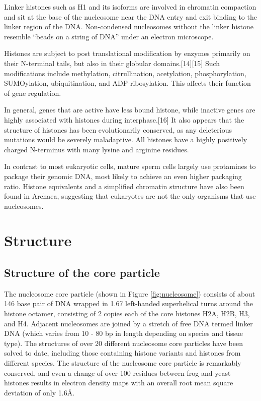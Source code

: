 Linker histones such as H1 and its isoforms are involved in chromatin compaction and sit at the base of the nucleosome near the DNA entry and exit binding to the linker region of the DNA. Non-condensed nucleosomes without the linker histone resemble ``beads on a string of DNA'' under an electron microscope.

Histones are subject to post translational modification by enzymes primarily on their N-terminal tails, but also in their globular domains.{[}14{]}{[}15{]} Such modifications include methylation, citrullination, acetylation, phosphorylation, SUMOylation, ubiquitination, and ADP-ribosylation. This affects their function of gene regulation.

In general, genes that are active have less bound histone, while inactive genes are highly associated with histones during interphase.{[}16{]} It also appears that the structure of histones has been evolutionarily conserved, as any deleterious mutations would be severely maladaptive. All histones have a highly positively charged N-terminus with many lysine and arginine residues.

In contrast to most eukaryotic cells, mature sperm cells largely use protamines to package their genomic DNA, most likely to achieve an even higher packaging ratio. Histone equivalents and a simplified chromatin structure have also been found in Archaea, suggesting that eukaryotes are not the only organisms that use nucleosomes.

\hypertarget{structure-1}{%
\section{Structure}\label{structure-1}}

\hypertarget{structure-of-the-core-particle}{%
\subsection{Structure of the core particle}\label{structure-of-the-core-particle}}

The nucleosome core particle (shown in Figure \ref{fig:nucleosome}) consists of about 146 base pair of DNA wrapped in 1.67 left-handed superhelical turns around the histone octamer, consisting of 2 copies each of the core histones H2A, H2B, H3, and H4. Adjacent nucleosomes are joined by a stretch of free DNA termed linker DNA (which varies from 10 - 80 bp in length depending on species and tissue type). The structures of over 20 different nucleosome core particles have been solved to date, including those containing histone variants and histones from different species. The structure of the nucleosome core particle is remarkably conserved, and even a change of over 100 residues between frog and yeast histones results in electron density maps with an overall root mean square deviation of only 1.6Å.


